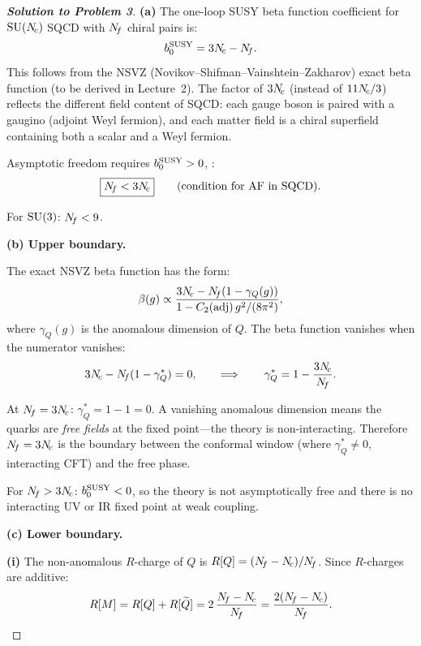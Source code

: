 \documentclass[11pt,a4paper]{article}
\begin{document}
\begin{proof}[\textbf{Solution to Problem 3}]

\textbf{(a)} The one-loop SUSY beta function coefficient for $\mathrm{SU}(N_{\!c})$
SQCD with $N_{\!f}$ chiral pairs is:
\begin{equation}
  b_0^{\mathrm{SUSY}} = 3N_{\!c} - N_{\!f}.
\end{equation}
This follows from the NSVZ (Novikov--Shifman--Vainshtein--Zakharov)
exact beta function (to be derived in Lecture~2).  The factor of $3N_{\!c}$
(instead of $11N_{\!c}/3$) reflects the different field content of SQCD:
each gauge boson is paired with a gaugino (adjoint Weyl fermion), and
each matter field is a chiral superfield containing both a scalar and a
Weyl fermion.

Asymptotic freedom requires $b_0^{\mathrm{SUSY}} > 0$, \ie:
\begin{equation}
  \boxed{N_{\!f} < 3N_{\!c}}
  \qquad\text{(condition for AF in SQCD).}
\end{equation}

For $\mathrm{SU}(3)$: $N_{\!f} < 9$.

\textbf{(b) Upper boundary.}

The exact NSVZ beta function has the form:
\begin{equation}
  \beta(g) \propto \frac{3N_{\!c} - N_{\!f}(1 - \gamma_Q(g))}{1 - C_2(\mathrm{adj})\,g^2/(8\pi^2)},
\end{equation}
where $\gamma_Q(g)$ is the anomalous dimension of $Q$.  The beta function
vanishes when the numerator vanishes:
\begin{equation}
  3N_{\!c} - N_{\!f}(1 - \gamma_Q^*) = 0,
  \qquad\Longrightarrow\qquad
  \gamma_Q^* = 1 - \frac{3N_{\!c}}{N_{\!f}}.
\end{equation}

At $N_{\!f} = 3N_{\!c}$: $\gamma_Q^* = 1 - 1 = 0$.  A vanishing anomalous
dimension means the quarks are \emph{free fields} at the fixed point---the
theory is non-interacting.  Therefore $N_{\!f} = 3N_{\!c}$ is the boundary between
the conformal window (where $\gamma_Q^* \neq 0$, interacting CFT) and the
free phase.

For $N_{\!f} > 3N_{\!c}$: $b_0^{\mathrm{SUSY}} < 0$, so the theory is not
asymptotically free and there is no interacting UV or IR fixed point at
weak coupling.

\textbf{(c) Lower boundary.}

\textbf{(i)} The non-anomalous $R$-charge of $Q$ is
$R[Q] = (N_{\!f} - N_{\!c})/N_{\!f}$.  Since $R$-charges are additive:
\begin{equation}
  R[M] = R[Q] + R[\widetilde{Q}]
  = 2\,\frac{N_{\!f} - N_{\!c}}{N_{\!f}}
  = \frac{2(N_{\!f} - N_{\!c})}{N_{\!f}}.
\end{equation}


\end{proof}
\end{document}
